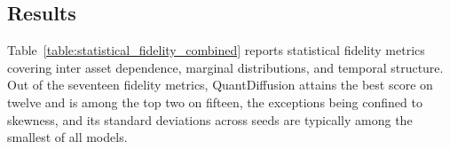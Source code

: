\documentclass[sigconf,natbib=false]{acmart}
\begin{document}
\subsection{Results}

Table~\ref{table:statistical_fidelity_combined} reports statistical fidelity metrics covering inter asset dependence, marginal distributions, and temporal structure. Out of the seventeen fidelity metrics, QuantDiffusion attains the best score on twelve and is among the top two on fifteen, the exceptions being confined to skewness, and its standard deviations across seeds are typically among the smallest of all models.

\begin{table}[htbp]
\centering
\caption{Statistical fidelity comparison across dependence, marginal distribution, and temporal structure metrics. Best in \textbf{bold}, second best \underline{underlined}; lower is better.}
\label{table:statistical_fidelity_combined}

\scriptsize
\setlength{\tabcolsep}{3pt}
\renewcommand{\arraystretch}{0.9}


\end{table}
\end{document}
